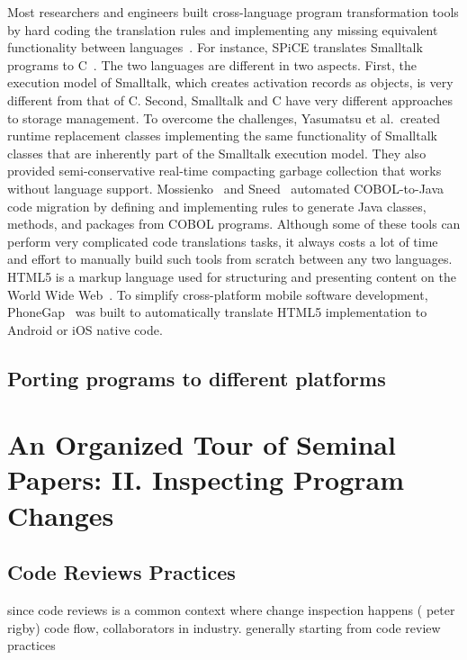 \documentclass[runningheads,a4paper]{llncs}
\begin{document}
Most researchers and engineers built cross-language program transformation tools by hard coding the translation rules and implementing any missing equivalent functionality between languages~\cite{Yasumatsu:95,Mossienko:03,Sneed:2010,jovial2c,cobol2java}. For instance, SPiCE translates Smalltalk programs to C~\cite{Yasumatsu:95}. The two languages are different in two aspects. First, the execution model of Smalltalk, which creates activation records as objects, is very different from that of C. Second, Smalltalk and C have very different approaches to storage management. To overcome the challenges, Yasumatsu et al.~created runtime replacement classes implementing the same functionality of Smalltalk classes that are inherently part of the Smalltalk execution model. They also provided semi-conservative real-time compacting garbage collection that works without language support.
Mossienko~\cite{Mossienko:03} and Sneed~\cite{Sneed:2010} automated COBOL-to-Java code migration by defining and implementing rules to generate Java classes, methods, and packages from COBOL programs. Although some of these tools can perform very complicated code translations tasks, it always costs a lot of time and effort to manually build such tools from scratch between any two languages. HTML5 is a markup language used for structuring and presenting content on the World Wide Web~\cite{html5}. To simplify cross-platform mobile software development, PhoneGap~\cite{phonegap} was built to automatically translate HTML5 implementation to Android or iOS native code.

\subsection{Porting programs to different platforms} 

\section{An Organized Tour of Seminal Papers: II. Inspecting Program Changes}

\subsection{Code Reviews Practices}
since code reviews is a common context where change inspection happens ( peter rigby)  code flow, collaborators in industry. generally starting from code review practices
\end{document}
